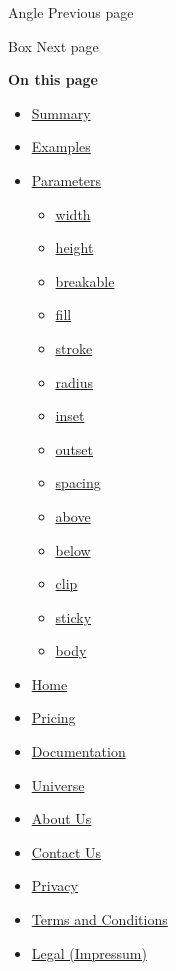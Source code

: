 { Angle } { Previous page }

\href{/docs/reference/layout/box/}{\pandocbounded{}}

{ Box } { Next page }

\textbf{On this page}

\begin{itemize}
\tightlist
\item
  \hyperref[summary]{Summary}
\item
  \hyperref[examples]{Examples}
\item
  \hyperref[parameters]{Parameters}

  \begin{itemize}
  \tightlist
  \item
    \hyperref[parameters-width]{width}
  \item
    \hyperref[parameters-height]{height}
  \item
    \hyperref[parameters-breakable]{breakable}
  \item
    \hyperref[parameters-fill]{fill}
  \item
    \hyperref[parameters-stroke]{stroke}
  \item
    \hyperref[parameters-radius]{radius}
  \item
    \hyperref[parameters-inset]{inset}
  \item
    \hyperref[parameters-outset]{outset}
  \item
    \hyperref[parameters-spacing]{spacing}
  \item
    \hyperref[parameters-above]{above}
  \item
    \hyperref[parameters-below]{below}
  \item
    \hyperref[parameters-clip]{clip}
  \item
    \hyperref[parameters-sticky]{sticky}
  \item
    \hyperref[parameters-body]{body}
  \end{itemize}
\end{itemize}

\begin{itemize}
\tightlist
\item
  \href{/}{Home}
\item
  \href{/pricing/}{Pricing}
\item
  \href{/docs/}{Documentation}
\item
  \href{/universe/}{Universe}
\item
  \href{/about/}{About Us}
\item
  \href{/contact/}{Contact Us}
\item
  \href{/privacy/}{Privacy}
\item
  \href{https://typst.app/terms}{Terms and Conditions}
\item
  \href{/legal/}{Legal (Impressum)}
\end{itemize}

